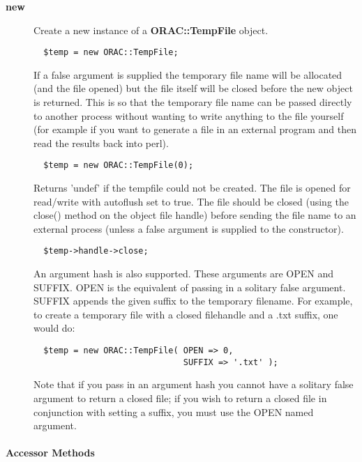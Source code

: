 \begin{description}

\item[\textbf{new}] \mbox{}

Create a new instance of a \textbf{ORAC::TempFile} object.

\begin{verbatim}
  $temp = new ORAC::TempFile;
\end{verbatim}


If a false argument is supplied the temporary file
name will be allocated (and the file opened) but the 
file itself will be closed before the new object is returned.
This is so that the temporary file name can be passed directly
to another process without wanting to write anything to the
file yourself (for example if you want to generate a file
in an external program and then read the results back into
perl).

\begin{verbatim}
  $temp = new ORAC::TempFile(0);
\end{verbatim}


Returns 'undef' if the tempfile could not be created.
The file is opened for read/write with autoflush set to true.
The file should be closed (using the close() method on the
object file handle) before sending the file name to an external
process (unless a false argument is supplied to the constructor).

\begin{verbatim}
  $temp->handle->close;
\end{verbatim}


An argument hash is also supported. These arguments are OPEN and
SUFFIX. OPEN is the equivalent of passing in a solitary false
argument. SUFFIX appends the given suffix to the temporary
filename. For example, to create a temporary file with a closed
filehandle and a .txt suffix, one would do:

\begin{verbatim}
  $temp = new ORAC::TempFile( OPEN => 0,
                              SUFFIX => '.txt' );
\end{verbatim}


Note that if you pass in an argument hash you cannot have a solitary
false argument to return a closed file; if you wish to return a closed
file in conjunction with setting a suffix, you must use the OPEN named
argument.

\end{description}
\paragraph*{Accessor Methods\label{ORAC::TempFile_Accessor_Methods}}


